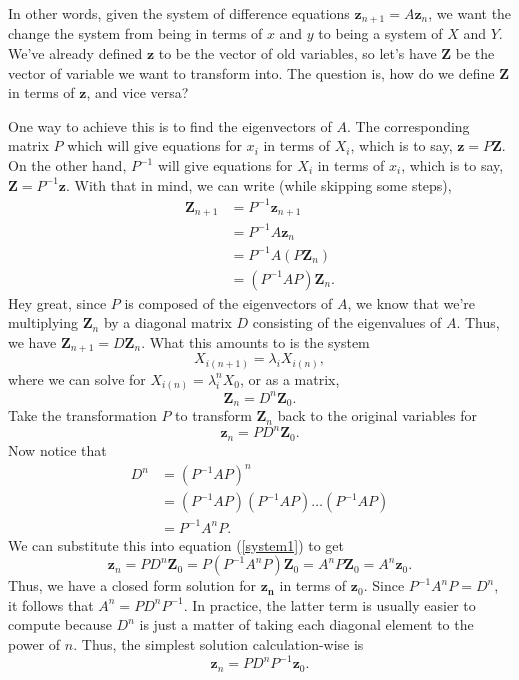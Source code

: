 \documentclass[12pt]{article}
\renewcommand{\vec}[1]{\mathbf{#1}}
\theoremstyle{definition}
\begin{document}
In other words, given the system of difference equations $\vec{z}_{n+1}=A\vec{z}_n$, we want the change the system from being in terms of $x$ and $y$ to being a system of $X$ and $Y$. We've already defined $\vec{z}$ to be the vector of old variables, so let's have $\vec{Z}$ be the vector of variable we want to transform into. The question is, how do we define $\vec{Z}$ in terms of $\vec{z}$, and vice versa?


One way to achieve this is to find the eigenvectors of $A$. The corresponding matrix $P$ which will give equations for $x_i$ in terms of $X_i$, which is to say, $\vec{z}=P\vec{Z}$. On the other hand, $P^{-1}$ will give equations for $X_i$ in terms of $x_i$, which is to say, $\vec{Z}=P^{-1}\vec{z}$. With that in mind, we can write (while skipping some steps),
\begin{align*}
	\vec{Z}_{n+1} 	&=	P^{-1}\vec{z}_{n+1} \\
				&=	P^{-1}A\vec{z}_n \\
				&=	P^{-1}A(P\vec{Z}_n) \\
				&=	(P^{-1}AP)\vec{Z}_n.
\end{align*}
Hey great, since $P$ is composed of the eigenvectors of $A$, we know that we're multiplying $\vec{Z}_n$ by a diagonal matrix $D$ consisting of the eigenvalues of $A$. Thus, we have $\vec{Z}_{n+1}=D \vec{Z}_n$. What this amounts to is the system
\[		X_{i(n+1)} = \lambda_i X_{i(n)},\]
where we can solve for $X_{i(n)}=\lambda_i^nX_0$, or as a matrix,
	\[	\vec{Z}_n = D^n \vec{Z}_0.	\]
Take the transformation $P$ to transform $\vec{Z}_n$ back to the original variables for
\begin{equation}
	\vec{z}_n = P D^n \vec{Z}_0.	\label{system1}
\end{equation}
Now notice that
\begin{align*}
	D^n 	&= (P^{-1}AP)^n\\
		&= (P^{-1}AP)(P^{-1}AP)\hdots (P^{-1}AP)\\
		&= P^{-1} A^n P.
\end{align*}
We can substitute this into equation (\ref{system1}) to get
\[\vec{z}_n = P D^n \vec{Z}_0 = P(P^{-1} A^n P)\vec{Z}_0 = A^n P \vec{Z}_0 = A^n\vec{z}_0.	\]
Thus, we have a closed form solution for $\vec{z_n}$ in terms of $\vec{z}_0$. Since $P^{-1}A^nP=D^n$, it follows that $A^n = PD^nP^{-1}$. In practice, the latter term is usually easier to compute because $D^n$ is just a matter of taking each diagonal element to the power of $n$. Thus, the simplest solution calculation-wise is 
\begin{equation} \vec{z}_n = PD^nP^{-1} \vec{z}_0.	\label{diffeqsoln}
\end{equation}
\end{document}

